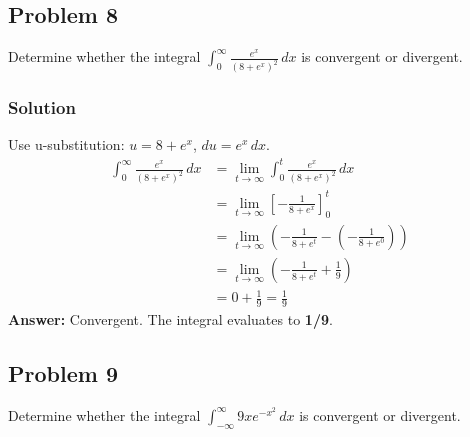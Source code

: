 \documentclass{article}
\begin{document}
\subsection{Problem 8}
Determine whether the integral $ \int_{0}^{\infty} \frac{e^x}{(8+e^x)^2} \,dx $ is convergent or divergent.
\subsubsection*{Solution}
Use u-substitution: $ u = 8+e^x $, $ du = e^x \,dx $.
\begin{align*}
    \int_{0}^{\infty} \frac{e^x}{(8+e^x)^2} \,dx &= \lim_{t \to \infty} \int_{0}^{t} \frac{e^x}{(8+e^x)^2} \,dx \\
    &= \lim_{t \to \infty} \left[ -\frac{1}{8+e^x} \right]_{0}^{t} \\
    &= \lim_{t \to \infty} \left( -\frac{1}{8+e^t} - \left(-\frac{1}{8+e^0}\right) \right) \\
    &= \lim_{t \to \infty} \left( -\frac{1}{8+e^t} + \frac{1}{9} \right) \\
    &= 0 + \frac{1}{9} = \frac{1}{9}
\end{align*}
\textbf{Answer:} Convergent. The integral evaluates to \textbf{1/9}.

\subsection{Problem 9}
Determine whether the integral $ \int_{-\infty}^{\infty} 9xe^{-x^2} \,dx $ is convergent or divergent.
\end{document}
